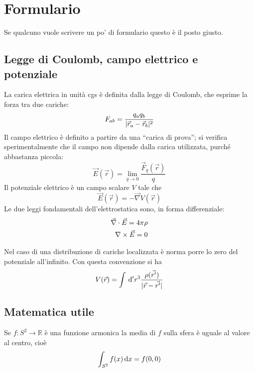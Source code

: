 \documentclass[../main.tex]{subfiles}
\begin{document}
\section{Formulario}
\setcounter{equation}{0}
\renewcommand{\theequation}{F.\arabic{equation}}

Se qualcuno vuole scrivere un po' di formulario questo è il posto giusto.

\subsection{Legge di Coulomb, campo elettrico e potenziale}\label{Preliminari}
La carica elettrica in unità cgs è definita dalla legge di Coulomb, che esprime la forza tra due cariche:
\begin{equation}
  \label{Coulomb}
  F_{ab}=\frac{q_aq_b}{\lvert\vec r_a -\vec r_b\rvert^2}
\end{equation}
Il campo elettrico è definito a partire da una ``carica di prova''; si verifica sperimentalmente che il campo non dipende dalla carica utilizzata, purché abbastanza piccola:
\begin{equation}
  \label{CampoElettrico}
  \vec E(\vec r)=\lim_{q \to 0} \frac{\vec F_q(\vec r)}{q}
\end{equation}
Il potenziale elettrico è un campo scalare $V$ tale che
\begin{equation}
  \label{Potenziale}
  \vec E(\vec r) = - \vec \nabla V(\vec r)
\end{equation}
Le due leggi fondamentali dell'elettrostatica sono, in forma differenziale:
\begin{subequations}
  \label{DifferenzialiElettrostatica}
  \begin{align}
    \vec \nabla \cdot \vec E = 4 \pi \rho\\
    \nabla\times \vec E = 0
  \end{align}
\end{subequations}

Nel caso di una distribuzione di cariche localizzata è norma porre lo zero del potenziale all'infinito. Con questa convenzione si ha
\begin{equation}\label{PotenzialeLocalizzato}
	V(\vec{r})=\int \,\mathrm d' r^3 \frac{\rho(\vec{r'})}{|\vec{r}-\vec{r'}|}
\end{equation}



\subsection{Matematica utile}\label{Matematica}
\begin{theorem}
  \label{ThMedia}
  Se $f:S^2 \to \mathbb{R}$ \`e una funzione armonica la media di $f$ sulla sfera è uguale al valore al centro, cioè
  \begin{equation}
    \int_{S^2} f(x) \,\mathrm d x = f(0,0)
  \end{equation}
\end{theorem}
\end{document}
